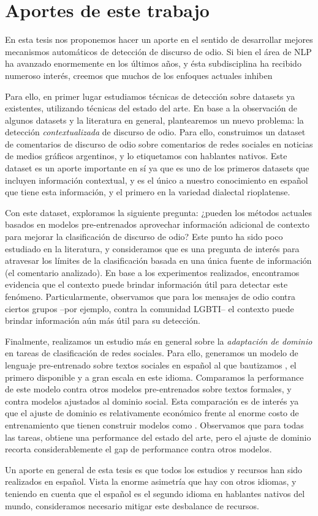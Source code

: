 \section{Aportes de este trabajo}

En esta tesis nos proponemos hacer un aporte en el sentido de desarrollar mejores mecanismos automáticos de detección de discurso de odio. Si bien el área de NLP ha avanzado enormemente en los últimos años, y ésta subdisciplina ha recibido numeroso interés, creemos que muchos de los enfoques actuales inhiben

Para ello, en primer lugar estudiamos técnicas de detección sobre datasets ya existentes, utilizando técnicas del estado del arte. En base a la observación de algunos datasets y la literatura en general, plantearemos un nuevo problema: la detección \emph{contextualizada} de discurso de odio. Para ello, construimos un dataset de comentarios de discurso de odio sobre comentarios de redes sociales en noticias de medios gráficos argentinos, y lo etiquetamos con hablantes nativos. Este dataset es un aporte importante en sí ya que es uno de los primeros datasets que incluyen información contextual, y es el único a nuestro conocimiento en español que tiene esta información, y el primero en la variedad dialectal rioplatense. 

Con este dataset, exploramos la siguiente pregunta: ¿pueden los métodos actuales basados en modelos pre-entrenados aprovechar información adicional de contexto para mejorar la clasificación de discurso de odio? Este punto ha sido poco estudiado en la literatura, y consideramos que es una pregunta de interés para atravesar los límites de la clasificación basada en una única fuente de información (el comentario analizado). En base a los experimentos realizados, encontramos evidencia que el contexto puede brindar información útil para detectar este fenómeno. Particularmente, observamos que para los mensajes de odio contra ciertos grupos --por ejemplo, contra la comunidad LGBTI-- el contexto puede brindar información aún más útil para su detección.

Finalmente, realizamos un estudio más en general sobre la \emph{adaptación de dominio} en tareas de clasificación de redes sociales. Para ello, generamos un modelo de lenguaje pre-entrenado sobre textos sociales en español al que bautizamos \robertuito{}, el primero disponible y a gran escala en este idioma. Comparamos la performance de este modelo contra otros modelos pre-entrenados sobre textos formales, y contra modelos ajustados al dominio social. Esta comparación es de interés ya que el ajuste de dominio es relativamente económico frente al enorme costo de entrenamiento que tienen construir modelos como \robertuito{}. Observamos que para todas las tareas, \robertuito{} obtiene una performance del estado del arte, pero el ajuste de dominio recorta considerablemente el gap de performance contra otros modelos.

Un aporte en general de esta tesis es que todos los estudios y recursos han sido realizados en español. Vista la enorme asimetría que hay con otros idiomas, y teniendo en cuenta que el español es el segundo idioma en hablantes nativos del mundo, consideramos necesario mitigar este desbalance de recursos.